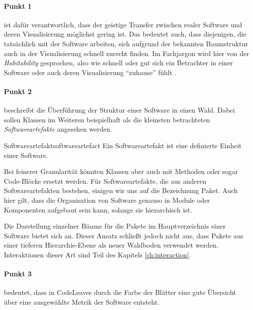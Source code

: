
\paragraph{Punkt 1} ist dafür verantwortlich, dass der geistige Transfer zwischen realer Software und deren Visualisierung möglichst gering ist. Das bedeutet auch, dass diejenigen, die tatsächlich mit der Software arbeiten, sich aufgrund der bekannten Baumstruktur auch in der Visualisierung schnell zurecht finden. Im Fachjargon wird hier von der \emph{Habitability} gesprochen, also wie schnell oder gut sich ein Betrachter in einer Software oder auch deren Visualisierung "`zuhause"' fühlt \cite{wettel2007program}.

\paragraph{Punkt 2} beschreibt die Überführung der Struktur einer Software in einen Wald. Dabei sollen Klassen im Weiteren beispielhaft als die kleinsten betrachteten \textit{Softwareartefakte} angesehen werden.

\begin{defbox}{Softwareartefakt}{softwareartefact}
  Ein Softwareartefakt ist eine definierte Einheit einer Software.
\end{defbox}

Bei feinerer Granularität könnten Klassen aber auch mit Methoden oder sogar Code-Blöcke ersetzt werden. Für Softwareartefakte, die aus anderen Softwareartefakten bestehen, einigen wir uns auf die Bezeichnung Paket. Auch hier gilt, dass die Organisation von Software genauso in Module oder Komponenten aufgebaut sein kann, solange sie hierarchisch ist.

Die Darstellung einzelner Bäume für die Pakete im Hauptverzeichnis einer Software bietet sich an. Dieser Ansatz schließt jedoch nicht aus, dass Pakete aus einer tieferen Hierarchie-Ebene als neuer Waldboden verwendet werden. Interaktionen dieser Art sind Teil des Kapitels \ref{ch:interaction}.

\paragraph{Punkt 3} bedeutet, dass in CodeLeaves durch die Farbe der Blätter eine gute Übersicht über eine ausgewählte Metrik der Software entsteht.

